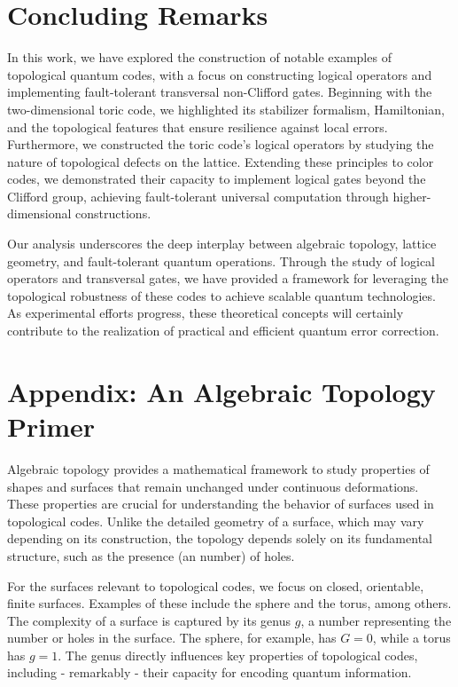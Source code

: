 \documentclass[12pt]{article}
\theoremstyle{definition}
\begin{document}
\section{Concluding Remarks}
In this work, we have explored the construction of notable examples of topological quantum codes, with a focus on constructing logical operators and implementing fault-tolerant transversal non-Clifford gates. Beginning with the two-dimensional toric code, we highlighted its stabilizer formalism, Hamiltonian, and the topological features that ensure resilience against local errors. Furthermore, we constructed the toric code's logical operators by studying the nature of topological defects on the lattice. Extending these principles to color codes, we demonstrated their capacity to implement logical gates beyond the Clifford group, achieving fault-tolerant universal computation through higher-dimensional constructions.\newline

Our analysis underscores the deep interplay between algebraic topology, lattice geometry, and fault-tolerant quantum operations. Through the study of logical operators and transversal gates, we have provided a framework for leveraging the topological robustness of these codes to achieve scalable quantum technologies. As experimental efforts progress, these theoretical concepts will certainly contribute to the realization of practical and efficient quantum error correction.

\newpage
\nocite{bombin2010,resende2019}  %



\newpage
\section{Appendix: An Algebraic Topology Primer}
Algebraic topology provides a mathematical framework to study properties of shapes and surfaces that remain unchanged under continuous deformations. These properties are crucial for understanding the behavior of surfaces used in topological codes. Unlike the detailed geometry of a surface, which may vary depending on its construction, the topology depends solely on its fundamental structure, such as the presence (an number) of holes.\newline

For the surfaces relevant to topological codes, we focus on closed, orientable, finite surfaces. Examples of these include the sphere and the torus, among others. The complexity of a surface is captured by its genus $g$, a number representing the number or holes in the surface. The sphere, for example, has $G = 0$, while a torus has $g = 1$. The genus directly influences key properties of topological codes, including - remarkably - their capacity for encoding quantum information.\newline
\end{document}

